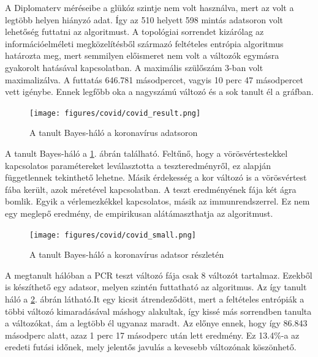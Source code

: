 A Diplomaterv méréseibe a glükóz szintje nem volt használva, mert az volt a legtöbb helyen hiányzó adat. Így az 510 helyett 598 mintás adatsoron volt lehetőség futtatni az algoritmust. A topológiai sorrendet kizárólag az információelméleti megközelítésből származó feltételes entrópia algoritmus határozta meg, mert semmilyen előismeret nem volt a változók egymásra gyakorolt hatásával kapcsolatban. A maximális szülőszám 3-ban volt maximalizálva. A futtatás 646.781 másodpercet, vagyis 10 perc 47 másodpercet vett igénybe. Ennek legfőbb oka a nagyszámú változó és a sok tanult él a gráfban.

\begin{figure}[htp]
    \centering
    \texttt{[image: figures/covid/covid\_result.png]}
    \caption{A tanult Bayes-háló a koronavírus adatsoron}
    \label{fig:covid_result}
\end{figure}

A tanult Bayes-háló a \ref{fig:covid_result}. ábrán található. Feltűnő, hogy a vörösvértestekkel kapcsolatos paramétereket leválasztotta a teszteredményről, ez alapján függetlennek tekinthető lehetne. Másik érdekesség a kor változó is a vörösvértest fába került, azok méretével kapcsolatban. A teszt eredményének fája két ágra bomlik. Egyik a vérlemezkékkel kapcsolatos, másik az immunrendszerrel. Ez nem egy meglepő eredmény, de empirikusan alátámaszthatja az algoritmust.

\begin{figure}[htp]
    \centering
    \texttt{[image: figures/covid/covid\_small.png]}
    \caption{A tanult Bayes-háló a koronavírus adatsor részletén}
    \label{fig:covid_small_result}
\end{figure}

A megtanult hálóban a PCR teszt változó fája csak 8 változót tartalmaz. Ezekből is készíthető egy adatsor, melyen szintén futtatható az algoritmus. Az így tanult háló a \ref{fig:covid_small_result}. ábrán látható.It egy kicsit átrendeződött, mert a feltételes entrópiák a többi változó kimaradásával máshogy alakultak, így kissé más sorrendben tanulta a változókat, ám a legtöbb él ugyanaz maradt. Az előnye ennek, hogy így 86.843 másodperc alatt, azaz 1 perc 17 másodperc után lett eredmény. Ez 13.4\%-a az eredeti futási időnek, mely jelentős javulás a kevesebb változónak köszönhető.

